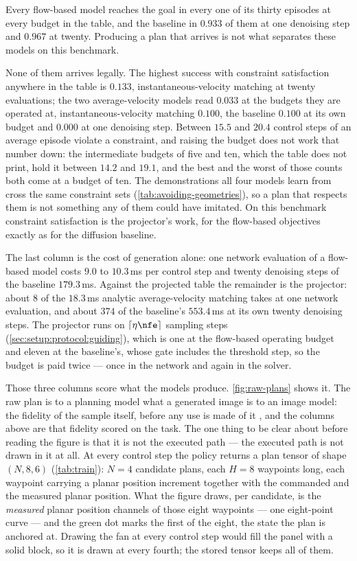Every flow-based model reaches the goal in every one of its thirty
episodes at every budget in the table, and the baseline in $0.933$ of them at one denoising step and
$0.967$ at twenty. Producing a plan that arrives is not what separates these models on this benchmark.

None of them arrives legally. The highest success with constraint satisfaction
anywhere in the table is $0.133$, instantaneous-velocity matching at twenty evaluations; the two
average-velocity models read $0.033$ at the budgets they are operated at, instantaneous-velocity
matching $0.100$, the baseline $0.100$ at its own budget and $0.000$ at one denoising step. Between
$15.5$ and $20.4$ control steps of an average episode violate a constraint, and raising the budget does
not work that number down: the intermediate budgets of five and ten, which the table does not print,
hold it between $14.2$ and $19.1$, and the best and the worst of those counts both come at a budget of ten.
The demonstrations all four models learn from cross the
same constraint sets (\autoref{tab:avoiding-geometries}), so a plan that respects them is not something
any of them could have imitated. On this benchmark constraint satisfaction is the projector's work, for
the flow-based objectives exactly as for the diffusion baseline.

The last column is the cost of generation alone: one network evaluation of a flow-based model costs $9.0$ to
$10.3$\,ms per control step and twenty denoising steps of the baseline $179.3$\,ms. Against the projected
table the remainder is the projector: about $8$ of the $18.3$\,ms analytic average-velocity matching
takes at one network evaluation, and about $374$ of the baseline's $553.4$\,ms at its own twenty
denoising steps. The projector runs on
$\lceil \eta\nfe \rceil$ sampling steps (\autoref{sec:setup:protocol:guiding}), which is one at the
flow-based operating budget and eleven at the baseline's, whose gate includes the threshold step, so the
budget is paid twice --- once in the network and again in the solver.

\FloatBarrier

Those three columns score what the models produce. \autoref{fig:raw-plans} shows it. The raw plan is to a
planning model what a generated image is to an image model: the fidelity of the sample itself, before any
use is made of it \parencite{ho2020denoising,lipman2023flow,geng2025meanflow}, and the columns above are
that fidelity scored on the task. The one thing to be clear about before reading the figure is that it is
not the executed path --- the executed path is not drawn in it
at all. At every control step the policy returns a plan tensor of shape $(N,8,6)$
(\autoref{tab:train}): $N=4$ candidate plans, each $H=8$ waypoints long, each waypoint carrying a planar
position increment together with the commanded and the measured planar position. What the figure draws,
per candidate, is the \emph{measured} planar position channels of those eight waypoints --- one
eight-point curve --- and the green dot marks the first of the eight, the state the plan is anchored at.
Drawing the fan at every control step would fill the panel with a solid block, so it is drawn at every
fourth; the stored tensor keeps all of them.

